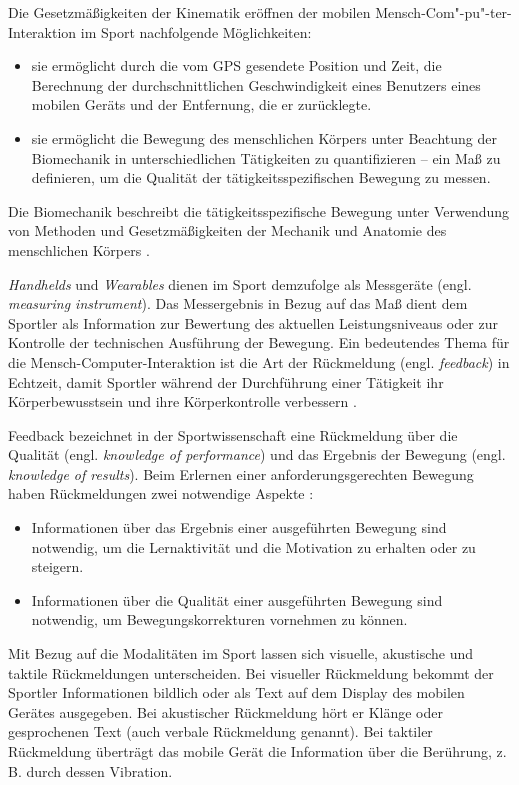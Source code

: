 Die Gesetzmäßigkeiten der Kinematik eröffnen der mobilen Mensch-Com"-pu"-ter-Interaktion im Sport nachfolgende Möglichkeiten:

\begin{itemize}
	\item sie ermöglicht durch die vom \ac{GPS} gesendete Position und Zeit, die Berechnung der durchschnittlichen Geschwindigkeit eines Benutzers eines mobilen Geräts und der Entfernung, die er zurücklegte.
	\item sie ermöglicht die Bewegung des menschlichen Körpers unter Beachtung der Biomechanik in unterschiedlichen Tätigkeiten zu quantifizieren – ein Maß zu definieren, um die Qualität der tätigkeitsspezifischen Bewegung zu messen.
\end{itemize}

Die Biomechanik beschreibt die tätigkeitsspezifische Bewegung unter Verwendung von Methoden und Gesetzmäßigkeiten der Mechanik und Anatomie des menschlichen Körpers \citep[vgl.][ S.~2~ff.]{Winter2009}.

\emph{Handhelds} und \emph{Wearables} dienen im Sport demzufolge als Messgeräte (engl. \emph{measuring instrument}). Das Messergebnis in Bezug auf das Maß dient dem Sportler als Information zur Bewertung des aktuellen Leistungsniveaus oder zur Kontrolle der technischen Ausführung der Bewegung. Ein bedeutendes Thema für die Mensch-Computer-Interaktion ist die Art der Rückmeldung (engl. \emph{feedback}) in Echtzeit, damit Sportler während der Durchführung einer Tätigkeit ihr Körperbewusstsein und ihre Körperkontrolle verbessern \citep[vgl.][]{Nylander2014}.

Feedback bezeichnet in der Sportwissenschaft eine Rückmeldung über die Qualität (engl. \emph{knowledge of performance}) und das Ergebnis der Bewegung (engl. \emph{knowledge of results})\citep[vgl.][S.~482]{Riemer2015}. Beim Erlernen einer anforderungsgerechten Bewegung haben Rückmeldungen zwei notwendige Aspekte \citep[vgl.][S.~152]{Meinel2007}:

\begin{itemize}
	\item Informationen über das Ergebnis einer ausgeführten Bewegung sind notwendig, um die Lernaktivität und die Motivation zu erhalten oder zu steigern.
	\item Informationen über die Qualität einer ausgeführten Bewegung sind notwendig, um Bewegungskorrekturen vornehmen zu können.
\end{itemize}

Mit Bezug auf die Modalitäten im Sport lassen sich visuelle, akustische und taktile Rückmeldungen unterscheiden. Bei visueller Rückmeldung bekommt der Sportler Informationen bildlich oder als Text auf dem Display des mobilen Gerätes ausgegeben. Bei akustischer Rückmeldung hört er Klänge oder gesprochenen Text (auch verbale Rückmeldung genannt). Bei taktiler Rückmeldung überträgt das mobile Gerät die Information über die Berührung, z. B. durch dessen Vibration.

